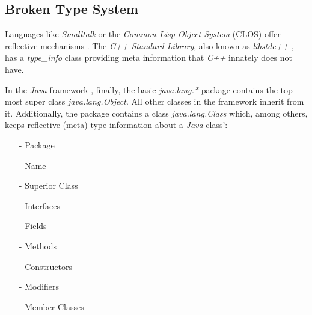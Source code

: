 %
%
%
%
%
%
%

\subsection{Broken Type System}
\label{broken_type_system_heading}

Languages like \emph{Smalltalk} or the \emph{Common Lisp Object System} (CLOS)
offer reflective mechanisms \cite{buschmann}. The \emph{C++ Standard Library},
also known as \emph{libstdc++} \cite{libstdcpp}, has a \emph{type\_info} class
providing meta information that \emph{C++} innately does not have.

In the \emph{Java} framework \cite{java}, finally, the basic \emph{java.lang.*}
package contains the top-most super class \emph{java.lang.Object}. All other
classes in the framework inherit from it. Additionally, the package contains a
class \emph{java.lang.Class} which, among others, keeps reflective (meta) type
information about a \emph{Java} class':

\begin{itemize}
    \item[-] Package
    \item[-] Name
    \item[-] Superior Class
    \item[-] Interfaces
    \item[-] Fields
    \item[-] Methods
    \item[-] Constructors
    \item[-] Modifiers
    \item[-] Member Classes
\end{itemize}

